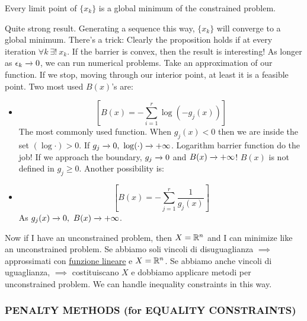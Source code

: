 \begin{prop}
Every limit point of $\{x_k\}$ is a global minimum of the constrained problem.
\end{prop}

Quite strong result. Generating a sequence this way, $\{x_k\}$ will converge to a global minimum. There's a trick: Clearly the proposition holds if at every iteration $\forall k\ \exists!\ x_k$. If the barrier is convex, then the result is interesting! As longer as $\epsilon_k \tendsto{} 0$, we can run numerical problems. Take an approximation of our function. If we stop, moving through our interior point, at least it is a feasible point. Two most used $B(x)$'s are:
\begin{itemize}
\item 
\[
	[B(x) = -\sum_{i=1}^r{\log(-g_j(x))}]
\]
The most commonly used function. When $g_j(x)<0$ then we are inside the set $(\log\mathord{\cdot})>0$. If $g_j \tendsto{} 0,\ \log(\mathord{\cdot})\tendsto{} +\infty$. Logarithm barrier function do the job! If we approach the boundary, $g_j\tendsto{} 0$ and $B(x)\tendsto{} +\infty$! $B(x)$ is not defined in $g_j \geq 0$. Another possibility is:
\item
\[
	[B(x) = -\sum_{j=1}^r{\frac{1}{g_j(x)}}]
\]
As $g_j(x) \tendsto{}0,\ B(x)\tendsto{} +\infty$.
\end{itemize}

Now if I have an unconstrained problem, then $X=\mathbb{R}^n$ and I can minimize like an unconstrained problem. Se abbiamo soli vincoli di disuguaglianza $\implies$ approssimati con \underline{funzione lineare} e $X=\mathbb{R}^n$.
 Se abbiamo anche vincoli di uguaglianza, $\implies$ costituiscano $X$ e dobbiamo applicare metodi per unconstrained problem. We can handle inequality constraints in this way.
 
\subsubsection{PENALTY METHODS (for EQUALITY CONSTRAINTS)}

